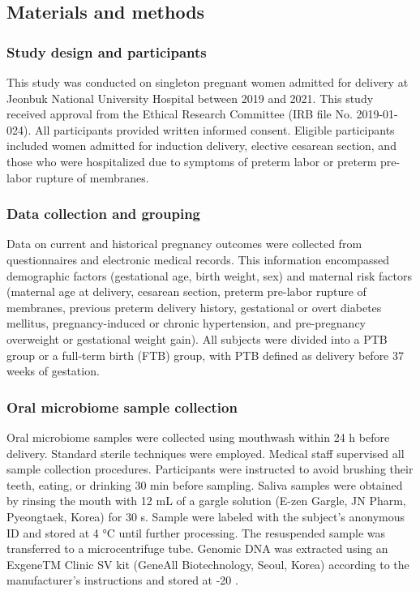 \documentclass[11pt, a4paper, onecolumn, oneside]{report}
\begin{document}
        \subsection{Materials and methods}
            \subsubsection{Study design and participants}
                This study was conducted on singleton pregnant women admitted for delivery at Jeonbuk National University Hospital between 2019 and 2021. This study received approval from the Ethical Research Committee (IRB file No. 2019-01-024). All participants provided written informed consent. Eligible participants included women admitted for induction delivery, elective cesarean section, and those who were hospitalized due to symptoms of preterm labor or preterm pre-labor rupture of membranes.

            \subsubsection{Data collection and grouping}
                Data on current and historical pregnancy outcomes were collected from questionnaires and electronic medical records. This information encompassed demographic factors (gestational age, birth weight, sex) and maternal risk factors (maternal age at delivery, cesarean section, preterm pre-labor rupture of membranes, previous preterm delivery history, gestational or overt diabetes mellitus, pregnancy-induced or chronic hypertension, and pre-pregnancy overweight or gestational weight gain). All subjects were divided into a PTB group or a full-term birth (FTB) group, with PTB defined as delivery before 37 weeks of gestation.

            \subsubsection{Oral microbiome sample collection}
                Oral microbiome samples were collected using mouthwash within 24 h before delivery. Standard sterile techniques were employed. Medical staff supervised all sample collection procedures. Participants were instructed to avoid brushing their teeth, eating, or drinking 30 min before sampling. Saliva samples were obtained by rinsing the mouth with 12 mL of a gargle solution (E-zen Gargle, JN Pharm, Pyeongtaek, Korea) for 30 s. Sample were labeled with the subject’s anonymous ID and stored at 4 °C until further processing. The resuspended sample was transferred to a microcentrifuge tube. Genomic DNA was extracted using an ExgeneTM Clinic SV kit (GeneAll Biotechnology, Seoul, Korea) according to the manufacturer’s instructions and stored at -20 \textcelsius.
\end{document}

